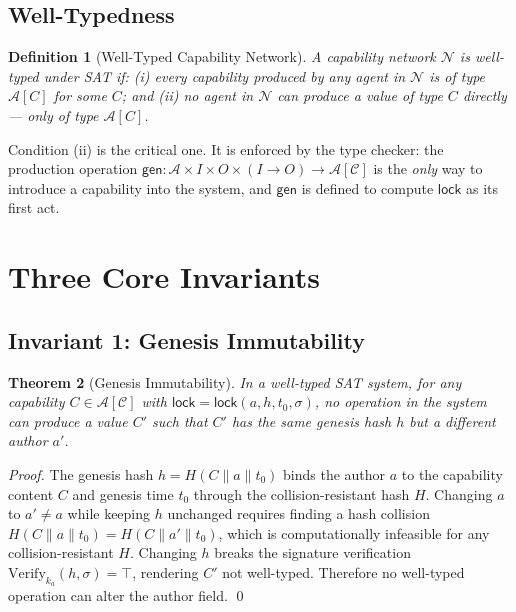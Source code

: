 \documentclass[12pt]{article}
\newtheorem{theorem}{Theorem}
\newtheorem{definition}[theorem]{Definition}
\newcommand{\CAP}{\mathcal{C}}
\newcommand{\ATTR}{\mathcal{A}}
\newcommand{\LOCK}{\mathsf{lock}}
\newcommand{\GEN}{\mathsf{gen}}
\begin{document}
\subsection{Well-Typedness}

\begin{definition}[Well-Typed Capability Network]
  A capability network $\mathcal{N}$ is \emph{well-typed under SAT} if:
  (i) every capability produced by any agent in $\mathcal{N}$ is of type
  $\ATTR[C]$ for some $C$; and (ii) no agent in $\mathcal{N}$ can produce a
  value of type $C$ directly — only of type $\ATTR[C]$.
\end{definition}

Condition (ii) is the critical one.  It is enforced by the type checker: the
production operation $\GEN : \mathcal{A} \times I \times O \times (I \to O)
\to \ATTR[\CAP]$ is the \emph{only} way to introduce a capability into the
system, and $\GEN$ is defined to compute $\LOCK$ as its first act.

\section{Three Core Invariants}
\label{sec:invariants}

\subsection{Invariant 1: Genesis Immutability}

\begin{theorem}[Genesis Immutability]
  In a well-typed SAT system, for any capability $C \in \ATTR[\CAP]$ with
  $\LOCK = \LOCK(a, h, t_0, \sigma)$, no operation in the system can produce
  a value $C'$ such that $C'$ has the same genesis hash $h$ but a different
  author $a'$.
\end{theorem}

\begin{proof}
  The genesis hash $h = H(C \| a \| t_0)$ binds the author $a$ to the
  capability content $C$ and genesis time $t_0$ through the collision-resistant
  hash $H$.  Changing $a$ to $a' \ne a$ while keeping $h$ unchanged requires
  finding a hash collision $H(C \| a \| t_0) = H(C \| a' \| t_0)$, which is
  computationally infeasible for any collision-resistant $H$.
  Changing $h$ breaks the signature verification
  $\text{Verify}_{k_a}(h, \sigma) = \top$, rendering $C'$ not well-typed.
  Therefore no well-typed operation can alter the author field. \qed
\end{proof}
\end{document}
